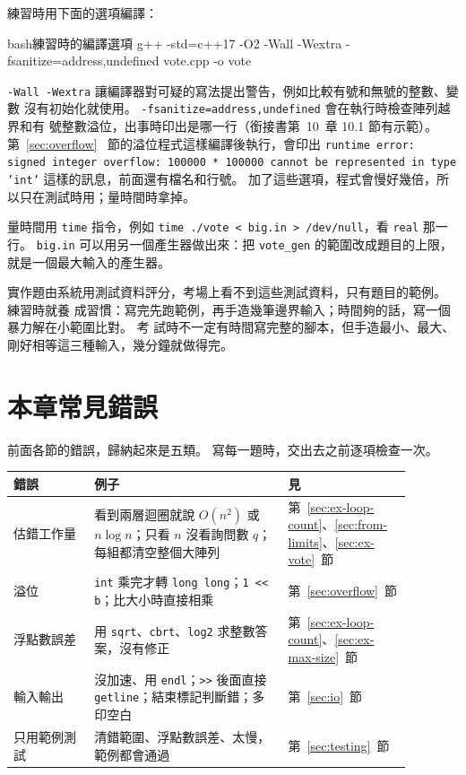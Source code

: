 練習時用下面的選項編譯：

\begin{code}{bash}{練習時的編譯選項}
g++ -std=c++17 -O2 -Wall -Wextra -fsanitize=address,undefined vote.cpp -o vote
\end{code}

\texttt{-Wall -Wextra} 讓編譯器對可疑的寫法提出警告，例如比較有號和無號的整數、變數
沒有初始化就使用。 \texttt{-fsanitize=address,undefined} 會在執行時檢查陣列越界和有
號整數溢位，出事時印出是哪一行（銜接書第~10~章 10.1 節有示範）。 第~\ref{sec:overflow}~
節的溢位程式這樣編譯後執行，會印出 \texttt{runtime error: signed integer overflow:
100000 * 100000 cannot be represented in type 'int'} 這樣的訊息，前面還有檔名和行號。
加了這些選項，程式會慢好幾倍，所以只在測試時用；量時間時拿掉。

量時間用 \texttt{time} 指令，例如 \texttt{time ./vote < big.in > /dev/null}，看
\texttt{real} 那一行。 \texttt{big.in} 可以用另一個產生器做出來：把
\texttt{vote\_gen} 的範圍改成題目的上限，就是一個最大輸入的產生器。

\begin{apcsnote}
實作題由系統用測試資料評分，考場上看不到這些測試資料，只有題目的範例。 練習時就養
成習慣：寫完先跑範例，再手造幾筆邊界輸入；時間夠的話，寫一個暴力解在小範圍比對。 考
試時不一定有時間寫完整的腳本，但手造最小、最大、剛好相等這三種輸入，幾分鐘就做得完。
\end{apcsnote}

\section{本章常見錯誤}
\label{sec:prep-pitfalls}

前面各節的錯誤，歸納起來是五類。 寫每一題時，交出去之前逐項檢查一次。

\begin{center}
\begin{tabular}{p{0.2\linewidth}p{0.48\linewidth}p{0.2\linewidth}}
\toprule
錯誤 & 例子 & 見 \\
\midrule
估錯工作量 & 看到兩層迴圈就說 $O(n^2)$ 或 $n \log n$；只看 $n$ 沒看詢問數 $q$；每組都清空整個大陣列 &
第~\ref{sec:ex-loop-count}、\ref{sec:from-limits}、\ref{sec:ex-vote}~節 \\
溢位 & \texttt{int} 乘完才轉 \texttt{long long}；\texttt{1 << b}；比大小時直接相乘 &
第~\ref{sec:overflow}~節 \\
浮點數誤差 & 用 \texttt{sqrt}、\texttt{cbrt}、\texttt{log2} 求整數答案，沒有修正 &
第~\ref{sec:ex-loop-count}、\ref{sec:ex-max-size}~節 \\
輸入輸出 & 沒加速、用 \texttt{endl}；\texttt{>>} 後面直接 \texttt{getline}；結束標記判斷錯；多印空白 &
第~\ref{sec:io}~節 \\
只用範例測試 & 清錯範圍、浮點數誤差、太慢，範例都會通過 &
第~\ref{sec:testing}~節 \\
\bottomrule
\end{tabular}
\end{center}

